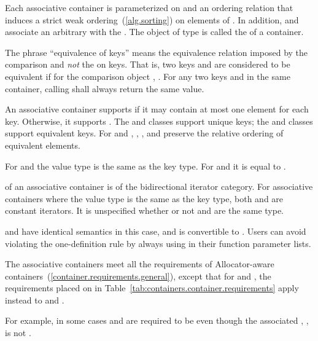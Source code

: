 \pnum
Each associative container is parameterized on
and an ordering relation
that induces a strict weak ordering~(\ref{alg.sorting}) on
elements of
.
In addition,
and
associate an arbitrary 
with the
.
The object of type
is called the
of a container.

\pnum
The phrase ``equivalence of keys'' means the equivalence relation imposed by the
comparison and
\textit{not}
the
on keys.
That is, two keys
and
are considered to be equivalent if for the
comparison object
,
.
For any two keys
and
in the same container, calling
shall always return the same value.

\pnum
An associative container supports  if it may contain at
most one element for each key. Otherwise, it supports .
The  and  classes support unique keys; the 
and  classes support equivalent keys.
For  and ,
, , and  preserve the relative ordering
of equivalent elements.

\pnum
For  and  the value type is the same as the key type.
For  and  it is equal to .

\pnum
{}
of an associative container is of the bidirectional iterator category.
For associative containers where the value type is the same as the key type, both
and
are constant iterators. It is unspecified whether or not
and
are the same type.
\begin{note}  and  have identical semantics in this case, and  is convertible to . Users can avoid violating the one-definition rule by always using  in their function parameter lists. \end{note}

\pnum
The associative containers meet all the requirements of Allocator-aware
containers~(\ref{container.requirements.general}), except that for
 and , the requirements placed on 
in Table~\ref{tab:containers.container.requirements} apply instead to 
and . \begin{note} For example, in some cases  and 
are required to be  even though the associated
, , is not
. \end{note}

